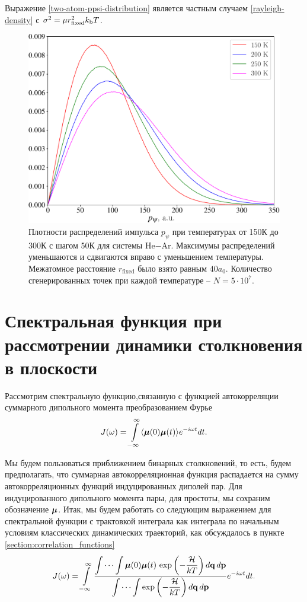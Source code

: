 Выражение \eqref{two-atom-ppsi-distribution} является частным случаем \eqref{rayleigh-density} с $\sigma^2 = \mu r_\text{fixed}^2 k_\text{b} T$.

\begin{figure}[H]
    \centering
    \includegraphics[width=0.75\linewidth]{./pictures/two_atom_distributions/pPsi-crop.pdf}
    \caption{Плотности распределений импульса $p_\psi$ при температурах от 150К до 300К с шагом 50К для системы He$-$Ar. Максимумы распределений уменьшаются и сдвигаются вправо с уменьшением температуры. Межатомное расстояние $r_\text{fixed}$ было взято равным $40a_0$. Количество сгенерированных точек при каждой температуре -- $N = 5 \cdot 10^7$.}
\end{figure}

\section{Спектральная функция при рассмотрении динамики столкновения в плоскости} \label{section:spectral_function_in_plane}

Рассмотрим спектральную функцию,связанную с функцией автокорреляции суммарного дипольного момента преобразованием Фурье
\begin{gather}
    J(\omega) = \int\limits_{-\infty}^\infty \langle  \boldsymbol{\mu}(0) \boldsymbol{\mu}(t)  \rangle e^{-i \omega t} dt.
\end{gather}

Мы будем пользоваться приближением бинарных столкновений, то есть, будем предполагать, что суммарная автокорреляционная функция распадается на сумму автокорреляционных функций индуцированных диполей пар. Для индуцированного дипольного момента пары, для простоты, мы сохраним обозначение $\boldsymbol{\mu}$. Итак, мы будем работать со следующим выражением для спектральной функции с трактовкой интеграла как интеграла по начальным условиям классических динамических траекторий, как обсуждалось в пункте \ref{section:correlation_functions} 
\begin{gather}
    J(\omega) = \int\limits_{-\infty}^\infty \frac{\displaystyle \idotsint \boldsymbol{\mu}(0) \boldsymbol{\mu}(t) \, \exp \left( -\frac{\mathcal{H}}{kT} \right) d\mathbf{q} \, d\mathbf{p}}{\displaystyle \idotsint \exp \left( -\frac{\mathcal{H}}{kT} \right) d\mathbf{q} \, d\mathbf{p}} e^{-i \omega t} dt. \label{two-atom-spectral-function1}
\end{gather}


